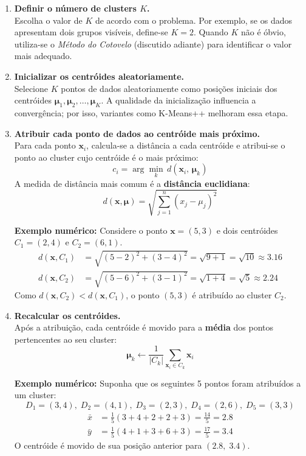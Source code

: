 \documentclass[12pt,a4paper]{article}
\begin{document}
\begin{enumerate}

  \item \textbf{Definir o número de clusters $K$.}\\
  Escolha o valor de $K$ de acordo com o problema. Por exemplo, se os dados apresentam dois grupos visíveis, define-se $K=2$. Quando $K$ não é óbvio, utiliza-se o \textit{Método do Cotovelo} (discutido adiante) para identificar o valor mais adequado.

  \item \textbf{Inicializar os centróides aleatoriamente.}\\
  Selecione $K$ pontos de dados aleatoriamente como posições iniciais dos centróides $\boldsymbol{\mu}_1, \boldsymbol{\mu}_2, \ldots, \boldsymbol{\mu}_K$. A qualidade da inicialização influencia a convergência; por isso, variantes como K-Means++ melhoram essa etapa.

  \item \textbf{Atribuir cada ponto de dados ao centróide mais próximo.}\\
  Para cada ponto $\mathbf{x}_i$, calcula-se a distância a cada centróide e atribui-se o ponto ao cluster cujo centróide é o mais próximo:
  \[
    c_i = \arg\min_{k}\, d(\mathbf{x}_i,\, \boldsymbol{\mu}_k)
  \]
  A medida de distância mais comum é a \textbf{distância euclidiana}:
  \[
    d(\mathbf{x}, \boldsymbol{\mu}) = \sqrt{\sum_{j=1}^{n}(x_j - \mu_j)^2}
  \]

  \textbf{Exemplo numérico:} Considere o ponto $\mathbf{x} = (5, 3)$ e dois centróides $C_1 = (2, 4)$ e $C_2 = (6, 1)$.
  \begin{align*}
    d(\mathbf{x}, C_1) &= \sqrt{(5-2)^2 + (3-4)^2} = \sqrt{9+1} = \sqrt{10} \approx 3{.}16 \\
    d(\mathbf{x}, C_2) &= \sqrt{(5-6)^2 + (3-1)^2} = \sqrt{1+4} = \sqrt{5}  \approx 2{.}24
  \end{align*}
  Como $d(\mathbf{x}, C_2) < d(\mathbf{x}, C_1)$, o ponto $(5,3)$ é atribuído ao cluster $C_2$.

  \item \textbf{Recalcular os centróides.}\\
  Após a atribuição, cada centróide é movido para a \textbf{média} dos pontos pertencentes ao seu cluster:
  \[
    \boldsymbol{\mu}_k \leftarrow \frac{1}{|C_k|} \sum_{\mathbf{x}_i \in C_k} \mathbf{x}_i
  \]

  \textbf{Exemplo numérico:} Suponha que os seguintes 5 pontos foram atribuídos a um cluster:
  \[
    D_1=(3,4),\; D_2=(4,1),\; D_3=(2,3),\; D_4=(2,6),\; D_5=(3,3)
  \]
  \begin{align*}
    \bar{x} &= \tfrac{1}{5}(3+4+2+2+3) = \tfrac{14}{5} = 2{.}8 \\
    \bar{y} &= \tfrac{1}{5}(4+1+3+6+3) = \tfrac{17}{5} = 3{.}4
  \end{align*}
  O centróide é movido de sua posição anterior para $(2{.}8,\; 3{.}4)$.


\end{enumerate}
\end{document}
